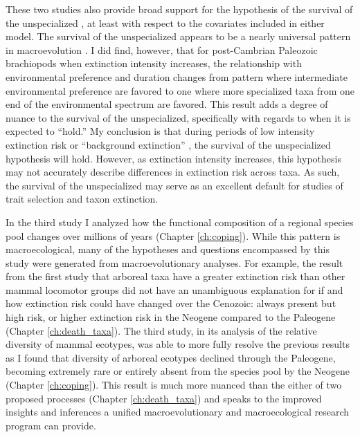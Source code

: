 These two studies also provide broad support for the hypothesis of the survival of the unspecialized \citep{Simpson1944}, at least with respect to the covariates included in either model. The survival of the unspecialized appears to be a nearly universal pattern in macroevolution \citep{Simpson1944,Liow2004a,Liow2007b,Nurnberg2013a,Nurnberg2015,Baumiller1993,Raia2016}. I did find, however, that for post-Cambrian Paleozoic brachiopods when extinction intensity increases, the relationship with environmental preference and duration changes from pattern where intermediate environmental preference are favored to one where more specialized taxa from one end of the environmental spectrum are favored. This result adds a degree of nuance to the survival of the unspecialized, specifically with regards to when it is expected to ``hold.'' My conclusion is that during periods of low intensity extinction risk or ``background extinction'' \citep{Jablonski1986,Foote2007b}, the survival of the unspecialized hypothesis will hold. However, as extinction intensity increases, this hypothesis may not accurately describe differences in extinction risk across taxa. As such, the survival of the unspecialized may serve as an excellent default for studies of trait selection and taxon extinction.

In the third study I analyzed how the functional composition of a regional species pool changes over millions of years (Chapter \ref{ch:coping}). While this pattern is macroecological, many of the hypotheses and questions encompassed by this study were generated from macroevolutionary analyses. For example, the result from the first study that arboreal taxa have a greater extinction risk than other mammal locomotor groups did not have an unambiguous explanation for if and how extinction risk could have changed over the Cenozoic: always present but high risk, or higher extinction risk in the Neogene compared to the Paleogene (Chapter \ref{ch:death_taxa}). The third study, in its analysis of the relative diversity of mammal ecotypes, was able to more fully resolve the previous results as I found that diversity of arboreal ecotypes declined through the Paleogene, becoming extremely rare or entirely absent from the species pool by the Neogene (Chapter \ref{ch:coping}). This result is much more nuanced than the either of two proposed processes (Chapter \ref{ch:death_taxa}) and speaks to the improved insights and inferences a unified macroevolutionary and macroecological research program can provide.

